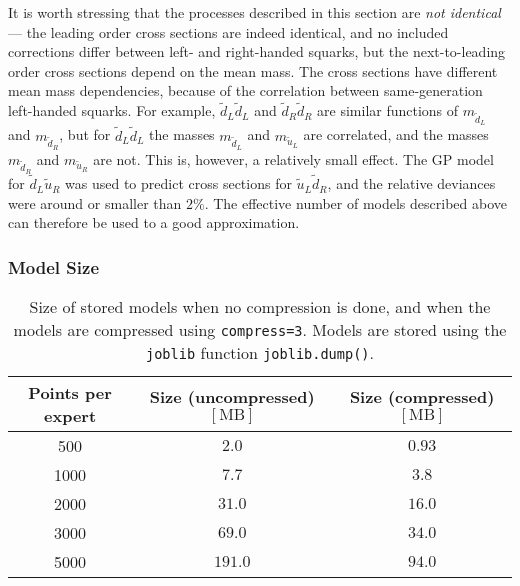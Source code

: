\documentclass[twoside,english]{uiofysmaster}
\begin{document}
{{%


It is worth stressing that the processes described in this section are \textit{not identical} --- the leading order cross sections are indeed identical, and no included corrections differ between left- and right-handed squarks, but the next-to-leading order cross sections depend on the mean mass. The cross sections have different mean mass dependencies, because of the correlation between same-generation left-handed squarks. For example, $\widetilde{d}_L \widetilde{d}_L$ and $\widetilde{d}_R \widetilde{d}_R$ are similar functions of $m_{\widetilde{d}_L}$ and $m_{\widetilde{d}_R}$, but for $\widetilde{d}_L \widetilde{d}_L$ the masses $m_{\widetilde{d}_L}$ and $m_{\widetilde{u}_L}$ are correlated, and the masses $m_{\widetilde{d}_R}$ and $m_{\widetilde{u}_R}$ are not. This is, however, a relatively small effect. The GP model for $\widetilde{d}_L \widetilde{u}_R$ was used to predict cross sections for $\widetilde{u}_L \widetilde{d}_R$, and the relative deviances were around or smaller than $2\%$. The effective number of models described above can therefore be used to a good approximation.
 

\subsubsection{Model Size}


\begin{table}
\centering
\begin{tabular}{@{}ccc@{}} \toprule
Points per expert & Size (uncompressed) $[\mathrm{MB}]$ & Size (compressed) $[\mathrm{MB}]$\\ \midrule
500 & $2.0$ & $0.93$\\
1000 & $7.7$ & $3.8$\\
2000 & $31.0$ & $16.0$\\
3000 & $69.0$ & $34.0$ \\
5000 & $191.0$ & $94.0$\\ \bottomrule
\end{tabular}
\caption{Size of stored models when no compression is done, and when the models are compressed using {\tt compress=3}. Models are stored using the {\tt joblib} function {\tt joblib.dump()}. }
\label{Tab:: results : Model sizes, uncompressed and compressed}
\end{table}

}}
\end{document}

